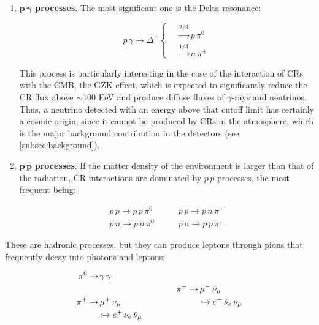 \begin{enumerate}[label=\textbullet]
	
    \item $\boldsymbol{p\,\gamma}$ \textbf{processes}. The most significant one is the Delta resonance:
	
	$$
	p\,\gamma \rightarrow \Delta^+ \left\{\begin{aligned}
	& \xrightarrow{\text{2/3}} p\,\pi^0 \\
	& \xrightarrow{\text{1/3}} n\,\pi^+ 
	\end{aligned}\right.
	$$
	
	This process is particularly interesting in the case of the interaction of CRs with the CMB, the GZK effect, which is expected to significantly reduce the CR flux above $\sim$100 EeV and produce diffuse fluxes of $\gamma$-rays and neutrinos. Thus, a neutrino detected with an energy above that cutoff limit has certainly a cosmic origin, since it cannot be produced by CRs in the atmosphere, which is the major background contribution in the detectors (see \autoref{subsec:background}).
	
	\item $\boldsymbol{p\,p}$ \textbf{processes}. If the matter density of the environment is larger than that of the radiation, CR interactions are dominated by $p\,p$ processes,  the most frequent being:
	
	$$
	\begin{aligned}
	p\,p \rightarrow p\,p\,\pi^0 \quad &\quad p\,p \rightarrow p\,n\,\pi^+ \\
	p\,n \rightarrow p\,n\,\pi^0 \quad &\quad p\,n \rightarrow p\,p\,\pi^-
	\end{aligned}
	$$
\end{enumerate}

These are hadronic processes, but they can produce leptons through pions that frequently decay into photons and leptons:

$$
\setlength{\jot}{2pt}
\begin{aligned}
\pi^0 \rightarrow & \,\gamma\,\gamma \\[15pt] %
\pi^+ \rightarrow & \,\mu^+ \, \nu_\mu \\
& \hookrightarrow e^+ \, \nu_e \, \bar{\nu}_\mu
\end{aligned}
\qquad\qquad
\begin{aligned}
\pi^- \rightarrow & \,\mu^- \, \bar{\nu}_\mu \\
& \hookrightarrow e^- \, \bar{\nu}_e \, \nu_\mu
\end{aligned}
$$

